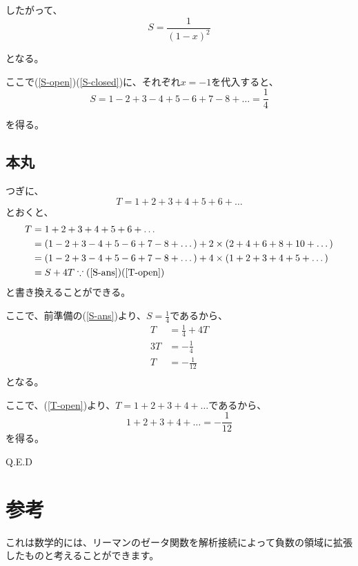 \documentclass[a4paper,12pt,fleqn]{ltjsarticle}
\begin{document}
したがって、
\begin{equation}
    \label{S-closed}
    S = \frac{1}{(1-x)^2}
\end{equation}

となる。

ここで(\ref{S-open})(\ref{S-closed})に、それぞれ$x = -1$を代入すると、
\begin{equation}
    \label{S-ans}
    S = 1 -2 + 3 - 4 + 5 - 6 + 7 - 8 + \dots = \frac{1}{4}
\end{equation}

を得る。

\subsection{本丸}
つぎに、
\begin{equation}
    \label{T-open}
    T = 1 + 2 + 3 + 4 + 5 + 6 + \dots
\end{equation}
とおくと、
\begin{align*}
    T &= 1 + 2 + 3 + 4 + 5 + 6 + \dots \\
      &= (1-2+3-4+5-6+7-8+\dots) + 2\times(2+4+6+8+10+\dots) \\
      &= (1-2+3-4+5-6+7-8+\dots) + 4\times(1+2+3+4+5+\dots) \\
      &= S + 4T
      \because (\ref{S-ans})(\ref{T-open})
\end{align*}
と書き換えることができる。

ここで、前準備の(\ref{S-ans})より、$S=\frac{1}{4}$であるから、
\begin{align*}
    T  &= \frac{1}{4} + 4T \\
    3T &= -\frac{1}{4} \\
    T &= -\frac{1}{12} \\
\end{align*}
となる。

ここで、(\ref{T-open})より、$T = 1 + 2 + 3 + 4 + \dots$であるから、
\begin{equation*}
    1 + 2 + 3 + 4 + \dots = -\frac{1}{12}
\end{equation*}
を得る。

\begin{flushright}
  Q.E.D
\end{flushright}

\newpage

\section{参考}
これは数学的には、リーマンのゼータ関数を解析接続によって負数の領域に拡張したものと考えることができます。
\end{document}
